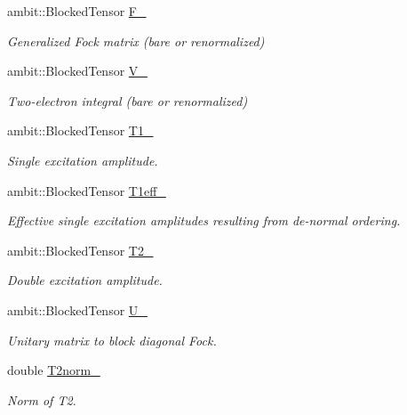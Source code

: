 \begin{DoxyCompactItemize}
ambit\+::\+Blocked\+Tensor \mbox{\hyperlink{classforte_1_1_d_s_r_g___m_r_p_t2_ab6622a65f174a811188a13bdee32be45}{F\+\_\+}}
\begin{DoxyCompactList}\small\item\em Generalized Fock matrix (bare or renormalized) \end{DoxyCompactList}\item 
ambit\+::\+Blocked\+Tensor \mbox{\hyperlink{classforte_1_1_d_s_r_g___m_r_p_t2_abebb14bafab184a654ac1651bee598da}{V\+\_\+}}
\begin{DoxyCompactList}\small\item\em Two-\/electron integral (bare or renormalized) \end{DoxyCompactList}\item 
ambit\+::\+Blocked\+Tensor \mbox{\hyperlink{classforte_1_1_d_s_r_g___m_r_p_t2_a7aa81e311b741ebc02c7de520ec37e13}{T1\+\_\+}}
\begin{DoxyCompactList}\small\item\em Single excitation amplitude. \end{DoxyCompactList}\item 
ambit\+::\+Blocked\+Tensor \mbox{\hyperlink{classforte_1_1_d_s_r_g___m_r_p_t2_aba58b056b5ec69d829d80525f31239d6}{T1eff\+\_\+}}
\begin{DoxyCompactList}\small\item\em Effective single excitation amplitudes resulting from de-\/normal ordering. \end{DoxyCompactList}\item 
ambit\+::\+Blocked\+Tensor \mbox{\hyperlink{classforte_1_1_d_s_r_g___m_r_p_t2_a9fbb97e2fa2d8bca88d951860fa8c742}{T2\+\_\+}}
\begin{DoxyCompactList}\small\item\em Double excitation amplitude. \end{DoxyCompactList}\item 
ambit\+::\+Blocked\+Tensor \mbox{\hyperlink{classforte_1_1_d_s_r_g___m_r_p_t2_a5111a77e3bb21ad1716ae011db790f84}{U\+\_\+}}
\begin{DoxyCompactList}\small\item\em Unitary matrix to block diagonal Fock. \end{DoxyCompactList}\item 
double \mbox{\hyperlink{classforte_1_1_d_s_r_g___m_r_p_t2_aceadcc0e83de0c996e3eaf668a3d2f0f}{T2norm\+\_\+}}
\begin{DoxyCompactList}\small\item\em Norm of T2. \end{DoxyCompactList}\item 

\end{DoxyCompactItemize}
